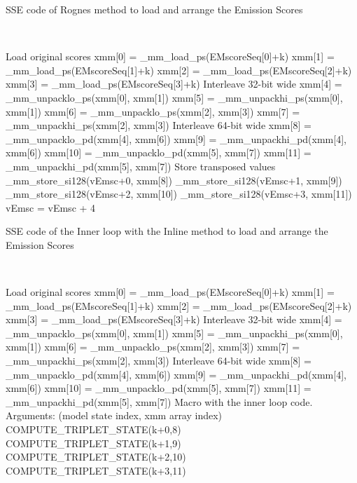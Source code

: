 \clearpage


\begin{algorithm}[htb!]
\caption[Rognes code to load emission scores] {SSE code of Rognes method to load and arrange the Emission Scores }
\label{code-loading-rognes}

\begin{algorithmic}
\\

	\LeftComment Load original scores
	\State	xmm[0] = \_mm\_load\_ps(EMscoreSeq[0]+k)
	\State	xmm[1] = \_mm\_load\_ps(EMscoreSeq[1]+k)
	\State	xmm[2] = \_mm\_load\_ps(EMscoreSeq[2]+k)
	\State xmm[3] = \_mm\_load\_ps(EMscoreSeq[3]+k)
	\LeftComment Interleave 32-bit wide
	\State xmm[4] = \_mm\_unpacklo\_ps(xmm[0], xmm[1])
	\State xmm[5] = \_mm\_unpackhi\_ps(xmm[0], xmm[1])
	\State xmm[6] = \_mm\_unpacklo\_ps(xmm[2], xmm[3])
	\State xmm[7] = \_mm\_unpackhi\_ps(xmm[2], xmm[3])
	\LeftComment Interleave 64-bit wide
	\State xmm[8]   = \_mm\_unpacklo\_pd(xmm[4], xmm[6])
	\State xmm[9]   = \_mm\_unpackhi\_pd(xmm[4], xmm[6])
	\State xmm[10] = \_mm\_unpacklo\_pd(xmm[5], xmm[7])
	\State xmm[11] = \_mm\_unpackhi\_pd(xmm[5], xmm[7])
	\LeftComment Store transposed values
	\State \_mm\_store\_si128(vEmsc+0, xmm[8])
	\State \_mm\_store\_si128(vEmsc+1, xmm[9])
	\State \_mm\_store\_si128(vEmsc+2, xmm[10])
	\State \_mm\_store\_si128(vEmsc+3, xmm[11])
	\State vEmsc = vEmsc + 4
\EndFor
\end{algorithmic}
\end{algorithm}
	
\clearpage




\begin{algorithm}[htb!]
\caption[Inline method code to load emission scores] {SSE code of the Inner loop with the Inline method to load and arrange the Emission Scores }
\label{code-loading-inline}

\begin{algorithmic}
\\

	\LeftComment Load original scores
	\State	xmm[0] = \_mm\_load\_ps(EMscoreSeq[0]+k)
	\State	xmm[1] = \_mm\_load\_ps(EMscoreSeq[1]+k)
	\State	xmm[2] = \_mm\_load\_ps(EMscoreSeq[2]+k)
	\State xmm[3] = \_mm\_load\_ps(EMscoreSeq[3]+k)
	\LeftComment Interleave 32-bit wide
	\State xmm[4] = \_mm\_unpacklo\_ps(xmm[0], xmm[1])
	\State xmm[5] = \_mm\_unpackhi\_ps(xmm[0], xmm[1])
	\State xmm[6] = \_mm\_unpacklo\_ps(xmm[2], xmm[3])
	\State xmm[7] = \_mm\_unpackhi\_ps(xmm[2], xmm[3])
	\LeftComment Interleave 64-bit wide
	\State xmm[8]   = \_mm\_unpacklo\_pd(xmm[4], xmm[6])
	\State xmm[9]   = \_mm\_unpackhi\_pd(xmm[4], xmm[6])
	\State xmm[10] = \_mm\_unpacklo\_pd(xmm[5], xmm[7])
	\State xmm[11] = \_mm\_unpackhi\_pd(xmm[5], xmm[7])
	\LeftComment Macro with the inner loop code. Arguments: (model state index, xmm array index)
	\State COMPUTE\_TRIPLET\_STATE(k+0,8)
	\State	COMPUTE\_TRIPLET\_STATE(k+1,9)
	\State COMPUTE\_TRIPLET\_STATE(k+2,10)
	\State	COMPUTE\_TRIPLET\_STATE(k+3,11)
\EndFor
\end{algorithmic}
\end{algorithm}

